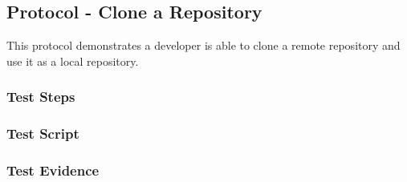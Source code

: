 \newpage
\subsection{Protocol - Clone a Repository}
This protocol demonstrates a developer is able to clone a
remote repository and use it as a local repository.

\subsubsection{Test Steps}
      {}
      {}

\newpage
\subsubsection{Test Script}


\newpage
\subsubsection{Test Evidence}
      {}
      {}
